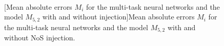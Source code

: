 \begin{figure}[t]
    \centering
    \\
    [Mean absolute errors $M_i$ for the multi-task neural networks and the model $M_{5,2}$ with and without injection]{Mean absolute errors $M_i$ for the multi-task neural networks and the model $M_{5,2}$ with and without NoS injection.}
    \label{fig:hybrid_multitask_mae}
\end{figure}


